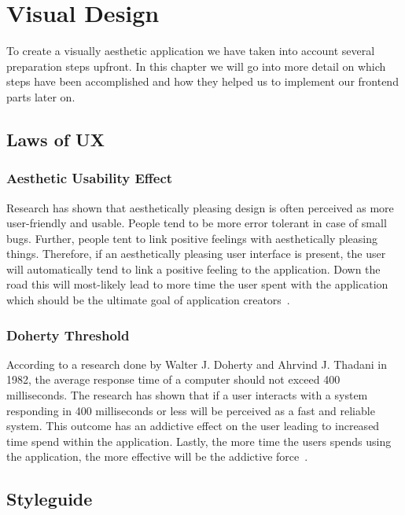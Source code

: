 \chapter{Visual Design}\label{ch:visual-design}

To create a visually aesthetic application we have taken into account several preparation steps upfront. In this chapter
we will go into more detail on which steps have been accomplished and how they helped us to implement our frontend parts
later on.

\section{Laws of UX}\label{sec:laws-of-ux}

\subsection{Aesthetic Usability Effect}\label{subsec:aestetic-usability-effect}

Research has shown that aesthetically pleasing design is often perceived as more user-friendly and usable.
People tend to be more error tolerant in case of small bugs.
Further, people tent to link positive feelings with aesthetically pleasing things.
Therefore, if an aesthetically pleasing user interface is present, the user will automatically tend to link a positive
feeling to the application.
Down the road this will most-likely lead to more time the user spent with the application which should be the ultimate
goal of application creators~\cite{lawsofuxAUE}.

\subsection{Doherty Threshold}\label{subsec:doherty-threshold}
According to a research done by Walter J. Doherty and Ahrvind J. Thadani in 1982, the average response time of a
computer should not exceed 400 milliseconds.
The research has shown that if a user interacts with a system responding in 400 milliseconds or less will be perceived
as a fast and reliable system.
This outcome has an addictive effect on the user leading to increased time spend within the application.
Lastly, the more time the users spends using the application, the more effective will be the addictive
force~\cite{lawsofuxDT}.

\section{Styleguide}\label{sec:styleguide}

